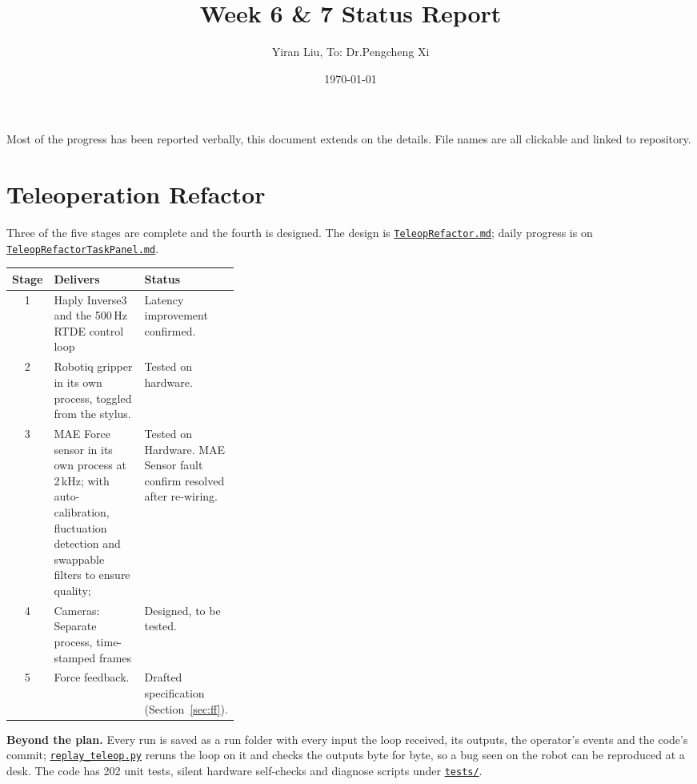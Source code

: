 \documentclass[11pt]{article}
\title{Week 6 \& 7 Status Report}
\author{Yiran Liu, To: Dr.Pengcheng Xi}
\date{\today}
\begin{document}
\maketitle

\noindent
Most of the progress has been reported verbally, this document extends on the details. File names are all clickable and linked to repository.

\section{Teleoperation Refactor}

Three of the five stages are complete and the fourth is designed.
The design is \href{https://gitlabc.nrc-cnrc.gc.ca/Yiran.Liu/nrc_robot_manipulation/-/blob/teleop-refactor/Documentation/Journal/2026Sep/TeleopRefactor.md}{\texttt{TeleopRefactor.md}}; daily progress is on
\href{https://gitlabc.nrc-cnrc.gc.ca/Yiran.Liu/nrc_robot_manipulation/-/blob/teleop-refactor/Documentation/Journal/2026Oct/TeleopRefactorTaskPanel.md}{\texttt{TeleopRefactorTaskPanel.md}}.

\begin{table}[H]
\centering\small
\begin{tabularx}{\linewidth}{@{}c>{\raggedright\arraybackslash}X>{\raggedright\arraybackslash}p{0.33\linewidth}@{}}
\toprule
Stage & Delivers & Status \\
\midrule
1 & Haply Inverse3 and the 500\,Hz RTDE control loop
  & Latency improvement confirmed. \\
2 & Robotiq gripper in its own process, toggled from the stylus.
  & Tested on hardware. \\
3 & MAE Force sensor in its own process at 2\,kHz; with auto-calibration, fluctuation detection and swappable filters to ensure quality;
  & Tested on Hardware. MAE Sensor fault confirm resolved after re-wiring. \\
4 & Cameras: Separate process, time-stamped frames
  & Designed, to be tested. \\
5 & Force feedback.
  & Drafted specification (Section~\ref{sec:ff}). \\
\bottomrule
\end{tabularx}
\end{table}

\noindent\textbf{Beyond the plan.}
Every run is saved as a run folder with every input the loop received, its outputs, the operator's events and the
code's commit; \href{https://gitlabc.nrc-cnrc.gc.ca/Yiran.Liu/nrc_robot_manipulation/-/blob/teleop-refactor/src/teleop/replay_teleop.py}{\texttt{replay\_teleop.py}} reruns the loop on it and checks the outputs byte for byte, so a
bug seen on the robot can be reproduced at a desk.
The code has 202 unit tests, silent hardware self-checks and diagnose scripts under \href{https://gitlabc.nrc-cnrc.gc.ca/Yiran.Liu/nrc_robot_manipulation/-/tree/teleop-refactor/tests}{\texttt{tests/}}.
\end{document}
